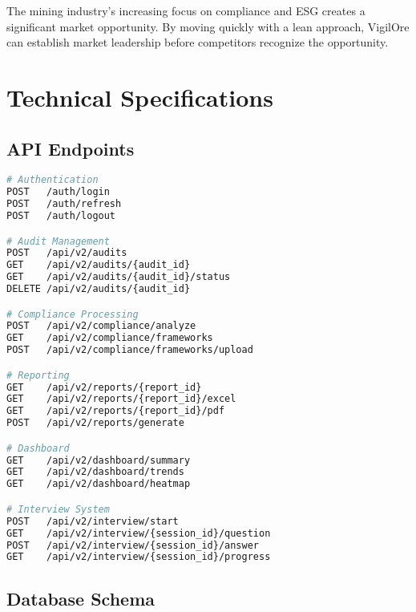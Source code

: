 \documentclass[12pt,a4paper]{report}
\begin{document}
The mining industry's increasing focus on compliance and ESG creates a significant market opportunity. By moving quickly with a lean approach, VigilOre can establish market leadership before competitors recognize the opportunity.

\appendix

\chapter{Technical Specifications}

\section{API Endpoints}

\begin{lstlisting}[language=bash, caption=Core API Endpoints]
# Authentication
POST   /auth/login
POST   /auth/refresh
POST   /auth/logout

# Audit Management
POST   /api/v2/audits
GET    /api/v2/audits/{audit_id}
GET    /api/v2/audits/{audit_id}/status
DELETE /api/v2/audits/{audit_id}

# Compliance Processing
POST   /api/v2/compliance/analyze
GET    /api/v2/compliance/frameworks
POST   /api/v2/compliance/frameworks/upload

# Reporting
GET    /api/v2/reports/{report_id}
GET    /api/v2/reports/{report_id}/excel
GET    /api/v2/reports/{report_id}/pdf
POST   /api/v2/reports/generate

# Dashboard
GET    /api/v2/dashboard/summary
GET    /api/v2/dashboard/trends
GET    /api/v2/dashboard/heatmap

# Interview System
POST   /api/v2/interview/start
GET    /api/v2/interview/{session_id}/question
POST   /api/v2/interview/{session_id}/answer
GET    /api/v2/interview/{session_id}/progress
\end{lstlisting}

\section{Database Schema}
\end{document}
